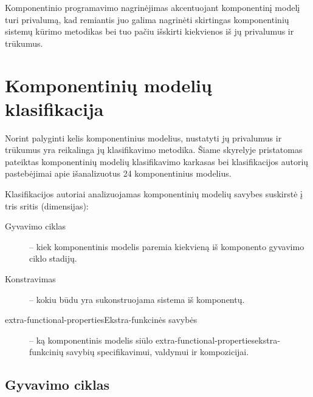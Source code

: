 Komponentinio programavimo nagrinėjimas akcentuojant komponentinį modelį
turi privalumą, kad remiantis juo galima nagrinėti skirtingas
komponentinių sistemų kūrimo metodikas bei tuo pačiu išskirti
kiekvienos iš jų privalumus ir trūkumus.

\section{Komponentinių modelių klasifikacija}

\label{section:component:model:classification}

Norint palyginti kelis komponentinius modelius, nustatyti jų privalumus
ir trūkumus yra reikalinga jų klasifikavimo metodika. Šiame skyrelyje
pristatomas \cite{classification-framework-for-scm} pateiktas
komponentinių modelių klasifikavimo karkasas bei klasifikacijos
autorių pastebėjimai apie išanalizuotus 24 komponentinius modelius.

Klasifikacijos autoriai analizuojamas komponentinių modelių savybes
suskirstė į tris sritis (dimensijas):
\begin{description}
  \item[Gyvavimo ciklas] – kiek komponentinis modelis paremia kiekvieną
    iš komponento gyvavimo ciklo stadijų.
  \item[Konstravimas] – kokiu būdu yra sukonstruojama sistema iš
    komponentų.
  \item[\gls{extra-functional-properties}{Ekstra-funkcinės savybės}]
    – ką komponentinis modelis siūlo
    \gls{extra-functional-properties}{ekstra-funkcinių savybių}
    specifikavimui, valdymui ir kompozicijai.
\end{description}

\subsection{Gyvavimo ciklas}

